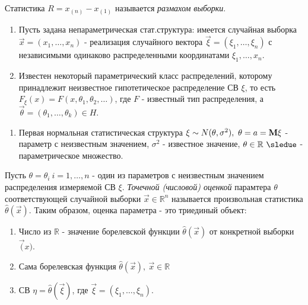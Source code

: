 \begin{defs}
  Статистика $R = x_{(n)} - x_{(1)}$ называется \textit{размахом выборки}.
\end{defs}

\begin{defs}
  \begin{enumerate}
    \item Пусть задана непараметрическая стат.структура: имеется случайная выборка
      $\overrightarrow{x}=(x_1,\ldots,x_n)$ - реализация случайного вектора
      $\overrightarrow{\xi} = (\xi_1,\ldots,\xi_n)$ с независимыми
      одинаково распределенными координатами $\xi_1,\ldots,x_n$.
    \item Известен некоторый параметрический класс распределений, которому
    принадлежит неизвестное гипотетическое распределение СВ $\xi$, то есть
    $F_{\xi}(x) = F(x,\theta_1,\theta_2,\ldots)$, где $F$ - известный тип распределения,
    а $\overrightarrow{\theta} = (\theta_1,\ldots,\theta_k) \in H$.
  \end{enumerate}
\end{defs}

\begin{example}
    \begin{enumerate}
      \item Первая нормальная статистическая структура $\xi \sim N(\theta,\sigma^2),
      \ \theta=a=\bf{M}\xi$ - параметр с неизвестным значением, $\sigma^2$ - известное значение,
      $\theta \in \mathbb{R} \ \sledue$ - параметрическое множество.
    \end{enumerate}
\end{example}

\begin{defs}
  Пусть $\theta = \theta_i \ i=1,\ldots,n$ - один из параметров с неизвестным значением
  распределения измеряемой СВ $\xi$. \textit{Точечной (числовой) оценкой} парамтера $\theta$
  соответствующей случайной выборки $\overrightarrow{x} \in \mathbb{R}^n$ называется произвольная
  статистика $\widehat{\theta}(\overrightarrow{x})$. Таким образом, оценка параметра - это
  триединый объект:
  \begin{enumerate}
      \item Число из $\mathbb{R}$ - значение борелевской функции $\widehat{\theta}(\overrightarrow{x})$ от
      конкретной выборки $\overrightarrow(x)$.
      \item Сама борелевская функция $\widehat{\theta}(\overrightarrow{x}), \ \overrightarrow{x} \in \mathbb{R}$
      \item СВ $\eta = \widehat{\theta}(\overrightarrow{\xi})$,
      где $\overrightarrow{\xi}=(\xi_1,\ldots,\xi_n)$.
  \end{enumerate}
\end{defs}

